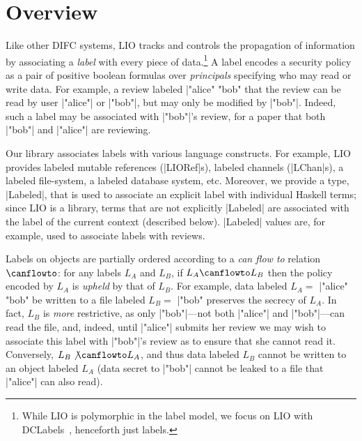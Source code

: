 \section{Overview}
\label{sec:overview}

Like other DIFC systems, LIO tracks and controls the propagation of
information by associating a \emph{label} with every piece of
data.\footnote{
  While LIO is polymorphic in the label model, we focus on LIO with
  DCLabels~\cite{dclabels}, henceforth just labels. 
}
%
A label encodes a security policy as a pair of positive boolean
formulas over \emph{principals} specifying who may read or write data.
%
For example, a review labeled \hs|"alice" \/ "bob" %
that the review can be read by user \hs|"alice"| or \hs|"bob"|, but
may only be modified by \hs|"bob"|.
%
Indeed, such a label may be associated with \hs|"bob"|'s review, for a
paper that both \hs|"bob"| and \hs|"alice"| are reviewing.
%

Our library associates labels with various language constructs.
%
For example, LIO provides labeled mutable references (\hs|LIORef|s),
labeled channels (\hs|LChan|s), a labeled file-system, a labeled
database system, etc.
%
Moreover, we provide a type, \hs|Labeled|, that is used to associate
an explicit label with individual Haskell terms; since LIO is a
library, terms that are not explicitly \hs|Labeled| are associated
with the label of the current context (described below).
%
\hs|Labeled| values are, for example, used to associate labels with
reviews.
%

Labels on objects are partially ordered according to a {\em can flow
  to} relation $\canflowto$: for any labels $L_A$ and $L_B$, if $L_A
  \canflowto L_B$ then the policy encoded by $L_A$ is \emph{upheld}
  by that of $L_B$.
%
For example, data labeled $L_A =$ \hs|"alice" \/ "bob" %
be written to a file labeled $L_B =$ \hs|"bob" %
preserves the secrecy of $L_A$.
%
In fact, $L_B$ is \emph{more} restrictive, as only
\hs|"bob"|---not both \hs|"alice"| and \hs|"bob"|---can read the file,
and, indeed, until \hs|"alice"| submits her review we may wish to
associate this label with \hs|"bob"|'s review as to ensure that she
cannot read it.
%
Conversely, $L_B \not\canflowto L_A$, and thus data labeled $L_B$
cannot be written to an object labeled $L_A$ (data secret to
\hs|"bob"| cannot be leaked to a file that \hs|"alice"| can also
read).

